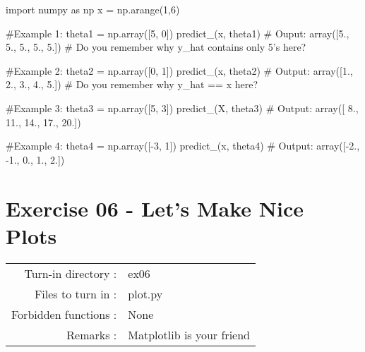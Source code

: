 \documentclass[]{article}
\newenvironment{Shaded}{\begin{snugshade}}{\end{snugshade}}
\newcommand{\CommentTok}[1]{\textcolor[rgb]{0.48,0.49,0.49}{#1}}
\newcommand{\DecValTok}[1]{\textcolor[rgb]{0.96,0.45,0.00}{#1}}
\newcommand{\FloatTok}[1]{\textcolor[rgb]{0.96,0.45,0.00}{#1}}
\newcommand{\ImportTok}[1]{\textcolor[rgb]{0.15,0.68,0.38}{#1}}
\newcommand{\NormalTok}[1]{\textcolor[rgb]{0.81,0.81,0.76}{#1}}
\newcommand{\OperatorTok}[1]{\textcolor[rgb]{0.81,0.81,0.76}{#1}}
\begin{document}
\begin{Shaded}
\begin{Highlighting}[]
\ImportTok{import}\NormalTok{ numpy }\ImportTok{as}\NormalTok{ np}
\NormalTok{x }\OperatorTok{=}\NormalTok{ np.arange(}\DecValTok{1}\NormalTok{,}\DecValTok{6}\NormalTok{)}

\CommentTok{#Example 1:}
\NormalTok{theta1 }\OperatorTok{=}\NormalTok{ np.array([}\DecValTok{5}\NormalTok{, }\DecValTok{0}\NormalTok{])}
\NormalTok{predict_(x, theta1)}
\CommentTok{# Ouput:}
\NormalTok{array([}\FloatTok{5.}\NormalTok{, }\FloatTok{5.}\NormalTok{, }\FloatTok{5.}\NormalTok{, }\FloatTok{5.}\NormalTok{, }\FloatTok{5.}\NormalTok{])}
\CommentTok{# Do you remember why y_hat contains only 5's here?  }


\CommentTok{#Example 2:}
\NormalTok{theta2 }\OperatorTok{=}\NormalTok{ np.array([}\DecValTok{0}\NormalTok{, }\DecValTok{1}\NormalTok{])}
\NormalTok{predict_(x, theta2)}
\CommentTok{# Output:}
\NormalTok{array([}\FloatTok{1.}\NormalTok{, }\FloatTok{2.}\NormalTok{, }\FloatTok{3.}\NormalTok{, }\FloatTok{4.}\NormalTok{, }\FloatTok{5.}\NormalTok{])}
\CommentTok{# Do you remember why y_hat == x here?  }


\CommentTok{#Example 3:}
\NormalTok{theta3 }\OperatorTok{=}\NormalTok{ np.array([}\DecValTok{5}\NormalTok{, }\DecValTok{3}\NormalTok{])}
\NormalTok{predict_(X, theta3)}
\CommentTok{# Output:}
\NormalTok{array([ }\FloatTok{8.}\NormalTok{, }\FloatTok{11.}\NormalTok{, }\FloatTok{14.}\NormalTok{, }\FloatTok{17.}\NormalTok{, }\FloatTok{20.}\NormalTok{])}


\CommentTok{#Example 4:}
\NormalTok{theta4 }\OperatorTok{=}\NormalTok{ np.array([}\OperatorTok{-}\DecValTok{3}\NormalTok{, }\DecValTok{1}\NormalTok{])}
\NormalTok{predict_(x, theta4)}
\CommentTok{# Output:}
\NormalTok{array([}\OperatorTok{-}\FloatTok{2.}\NormalTok{, }\FloatTok{-1.}\NormalTok{,  }\FloatTok{0.}\NormalTok{,  }\FloatTok{1.}\NormalTok{,  }\FloatTok{2.}\NormalTok{])}
\end{Highlighting}
\end{Shaded}

\clearpage

\hypertarget{exercise-06---lets-make-nice-plots-1}{%
\section{Exercise 06 - Let's Make Nice
Plots}\label{exercise-06---lets-make-nice-plots-1}}

\begin{longtable}[]{@{}rl@{}}
\toprule
\endhead
Turn-in directory : & ex06\tabularnewline
Files to turn in : & plot.py\tabularnewline
Forbidden functions : & None\tabularnewline
Remarks : & Matplotlib is your friend\tabularnewline
\bottomrule
\end{longtable}
\end{document}
